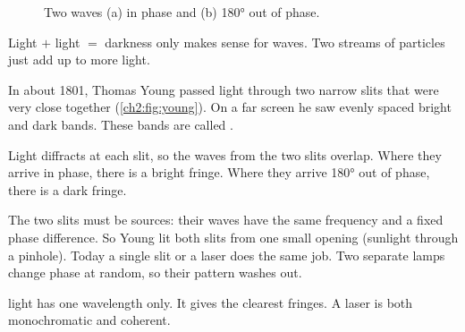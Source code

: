 \begin{figure}
  \centering
  \caption{Two waves (a) in phase and (b) \ang{180} out of phase.}
  \label{ch2:fig:superposition}
\end{figure}

Light $+$ light $=$ darkness only makes sense for waves. Two streams of particles just
add up to more light.

In about 1801, Thomas Young passed light through two narrow slits that were very close
together (\cref{ch2:fig:young}). On a far screen he saw evenly spaced bright and dark
bands. These bands are called .

Light diffracts at each slit, so the waves from the two slits overlap. Where they arrive
in phase, there is a bright fringe. Where they arrive \ang{180} out of phase, there is a
dark fringe.

The two slits must be  sources: their waves have the same frequency and a
fixed phase difference. So Young lit both slits from one small opening (sunlight through a
pinhole). Today a single slit or a laser does the same job. Two separate lamps change
phase at random, so their pattern washes out.

 light has one wavelength only. It gives the clearest fringes. A laser
is both monochromatic and coherent.

